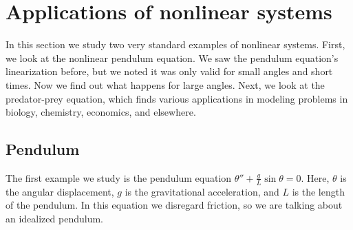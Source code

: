 \section{Applications of nonlinear systems}
\label{nlinapps:section}



In this section we study two very standard examples of nonlinear
systems.  First, we look at the nonlinear pendulum equation.  We saw
the pendulum equation's linearization before, but we noted it
was only valid for small angles and short times.  Now we find out what
happens for large angles.  Next, we look at the predator-prey equation,
which finds various applications in modeling problems in biology, chemistry,
economics, and elsewhere.

\subsection{Pendulum}

The first example we study is the pendulum equation
$\theta''+\frac{g}{L} \sin \theta = 0$.  Here, $\theta$ is the angular
displacement, $g$ is the gravitational acceleration, and $L$ is the length of
the pendulum.  In this equation we disregard friction, so we are talking
about an idealized pendulum.


